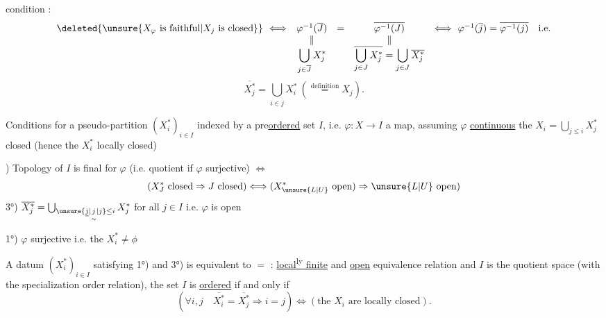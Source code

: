  condition : 
\[
\begin{array}{rclcl}
\deleted{\unsure{X_\varphi\text{ is faithful}|X_j\text{ is closed}}}\ \Longleftrightarrow&
\varphi^{-1}(\overline J)&=&\overline{\varphi^{-1}(J)}&
\Longleftrightarrow\ \varphi^{-1}(\overline j)=\overline{\varphi^{-1}(j)}\quad\text{i.e.}\\
&\Vert&&\Vert&\\
&\displaystyle\bigcup_{j\in\overline J}X_j^*&&
\displaystyle\overline{\bigcup_{j\in J}X_j^*}=\bigcup_{j\in J}\overline{X_j^*}&
\end{array}
\]
\[
\overline{X_j^*}=\bigcup_{i\in\overline j}X_i^*\ (\overset{\mathrm{definition}}=X_j).
\]

Conditions for a  pseudo-partition $(X_i^*)_{i\in I}$ indexed by a
pre\uline{ordered} set $I$, i.e. $\varphi:X\longrightarrow I$ a map, assuming $\varphi$ \uline{continuous}
 the $X_i=\bigcup_{j\leq i}X_j^*$ closed (hence the $X_i^*$ locally closed)

) Topology of $I$ is final for $\varphi$ (i.e. quotient if $\varphi$ surjective) $\Longleftrightarrow$
\[
(X_J^*\text{ closed}\Rightarrow J\text{ closed})\Longleftrightarrow
(X_{\unsure{L|U}}^*\text{ open})\Rightarrow\unsure{L|U}\text{ open})
\]
3°) $\overline{X_j^*}=\bigcup_{\unsure{\underline{j}|\underset{\sim}{j}|j}\leq i}X_j^*$ for all $j\in I$ i.e. $\varphi$ is open

1°) $\varphi$ surjective i.e. the $X_i^*\ne\phi$

A datum $(X_i^*)_{i\in I}$ satisfying 1°) and 3°) is equivalent to
$=$ :  \uline{local\textsuperscript{ly} finite} and \uline{open} equivalence relation
and $I$ is the quotient space (with the specialization order
relation),  the set $I$ is \uline{ordered} if and only if
\[
(\forall i,j\quad\overline{X_i^*}=\overline{X_j^*}\Rightarrow i=j)
\Longleftrightarrow(\text{the }X_i\text{ are locally closed}).
\]

